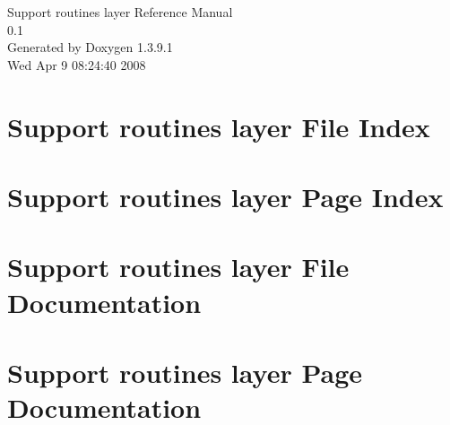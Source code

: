 \documentclass[a4paper]{book}
\begin{document}
\begin{titlepage}
\vspace*{7cm}
\begin{center}
{\Large Support routines layer Reference Manual\\[1ex]\large 0.1 }\\
\vspace*{1cm}
{\large Generated by Doxygen 1.3.9.1}\\
\vspace*{0.5cm}
{\small Wed Apr 9 08:24:40 2008}\\
\end{center}
\end{titlepage}
\clearemptydoublepage
{}
\tableofcontents
\clearemptydoublepage
{}
\chapter{Support routines layer File Index}

\chapter{Support routines layer Page Index}

\chapter{Support routines layer File Documentation}















\chapter{Support routines layer Page Documentation}

\printindex
\end{document}
